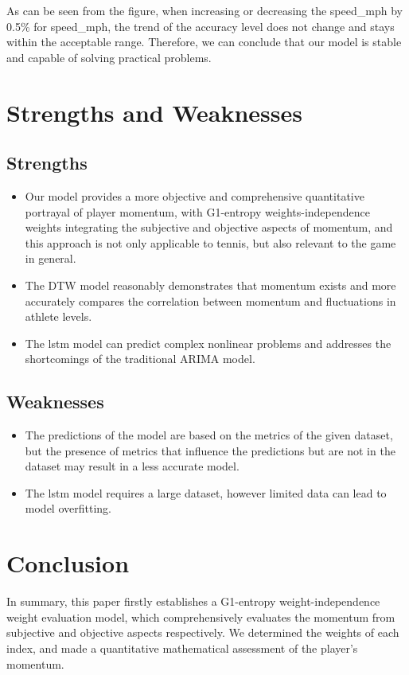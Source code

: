 \documentclass[12pt]{article}  %
\begin{document}
As can be seen from the figure, when increasing or decreasing the speed\_mph by 0.5\% for speed\_mph, the trend of the accuracy level does not change and stays within the acceptable range. Therefore, we can conclude that our model is stable and capable of solving practical problems.

\section{Strengths and Weaknesses}
\subsection{Strengths}
\begin{itemize}
    \item Our model provides a more objective and comprehensive quantitative portrayal of player momentum, with G1-entropy weights-independence weights integrating the subjective and objective aspects of momentum, and this approach is not only applicable to tennis, but also relevant to the game in general.
    \item The DTW model reasonably demonstrates that momentum exists and more accurately compares the correlation between momentum and fluctuations in athlete levels.
    \item The lstm model can predict complex nonlinear problems and addresses the shortcomings of the traditional ARIMA model.
\end{itemize}
\subsection{Weaknesses}
\begin{itemize}
    \item The predictions of the model are based on the metrics of the given dataset, but the presence of metrics that influence the predictions but are not in the dataset may result in a less accurate model.
    \item The lstm model requires a large dataset, however limited data can lead to model overfitting.
\end{itemize}

\section{Conclusion}
In summary, this paper firstly establishes a G1-entropy weight-independence weight evaluation model, which comprehensively evaluates the momentum from subjective and objective aspects respectively. We determined the weights of each index, and made a quantitative mathematical assessment of the player's momentum.
\end{document}
